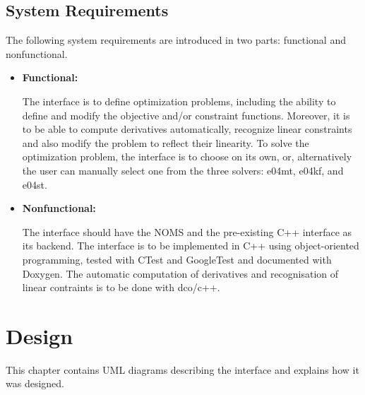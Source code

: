 \documentclass{book}
\begin{document}
\section{System Requirements}
The following system requirements are introduced in two parts: functional and nonfunctional. 
\begin{itemize}
\item \textbf{Functional:}

The interface is to define optimization problems, including the ability to define and modify the objective and/or constraint functions. Moreover, it is to be able to compute derivatives automatically, recognize linear constraints and also modify the problem to reflect their linearity. To solve the optimization problem, the interface is to choose on its own, or, alternatively the user can manually select one from the three solvers: e04mt, e04kf, and e04st. 

\item \textbf{Nonfunctional:}

The interface should have the NOMS and the pre-existing C++ interface as its backend. The interface is to be implemented in C++ using object-oriented programming, tested with CTest and GoogleTest and documented with Doxygen. The automatic computation of derivatives and recognisation of linear contraints is to be done with dco/c++. 
\end{itemize}

\chapter{Design} \label{ch:design}
This chapter contains UML diagrams describing the interface and explains how it was designed.
\end{document}
